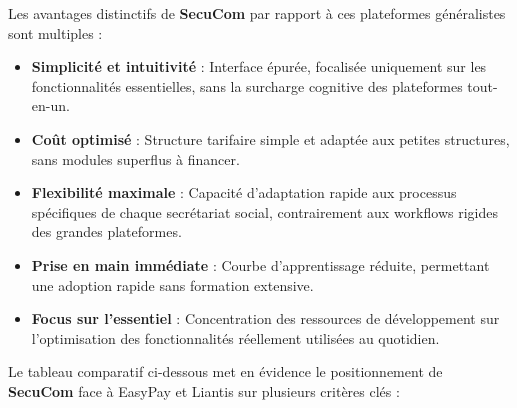 \begin{tcolorbox}[
  title={\textbf{Avantages distinctifs de SecuCom}},
  colback=blue!5!white,
  colframe=primarycolor,
  fonttitle=\bfseries,
  boxrule=0.5mm,
  arc=2mm,
  left=6mm,
  right=6mm,
  top=6mm,
  bottom=6mm
]
\noindent Les avantages distinctifs de \textbf{SecuCom} par rapport à ces plateformes généralistes sont multiples :

\begin{itemize}[leftmargin=*,label=\textcolor{darkgray}{$\bullet$},itemsep=0.3em]
  \item \textbf{Simplicité et intuitivité} : Interface épurée, focalisée uniquement sur les fonctionnalités essentielles, sans la surcharge cognitive des plateformes tout-en-un.
  \item \textbf{Coût optimisé} : Structure tarifaire simple et adaptée aux petites structures, sans modules superflus à financer.
  \item \textbf{Flexibilité maximale} : Capacité d'adaptation rapide aux processus spécifiques de chaque secrétariat social, contrairement aux workflows rigides des grandes plateformes.
  \item \textbf{Prise en main immédiate} : Courbe d'apprentissage réduite, permettant une adoption rapide sans formation extensive.
  \item \textbf{Focus sur l'essentiel} : Concentration des ressources de développement sur l'optimisation des fonctionnalités réellement utilisées au quotidien.
\end{itemize}
\end{tcolorbox}

\vspace{0.5cm}

\noindent Le tableau comparatif ci-dessous met en évidence le positionnement de \textbf{SecuCom} face à EasyPay et Liantis sur plusieurs critères clés :

